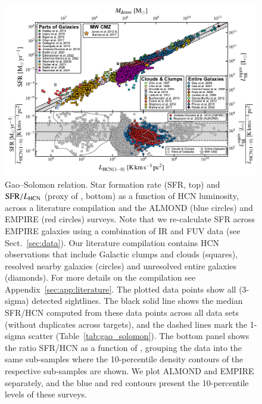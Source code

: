 \documentclass[letter, longauth]{aa} %
\begin{document}
\begin{figure}
\centering
\includegraphics[width=\textwidth]{Figures/GS_relation_literature_compilation_compressed.pdf}
\caption{Gao--Solomon relation. Star formation rate (SFR, top) and $\mathrm{SFR}/L_{\text{HCN}}$ (proxy of \sfedense, bottom) as a function of HCN luminosity, across a literature compilation and the ALMOND (blue circles) and EMPIRE (red circles) surveys.
Note that we re-calculate SFR across EMPIRE galaxies using a combination of IR and FUV data (see Sect.~\ref{sec:data}).
Our literature compilation contains HCN observations that include Galactic clumps and clouds (squares), resolved nearby galaxies (circles) and unresolved entire galaxies (diamonds).
For more details on the compilation see Appendix~\ref{sec:app:literature}.
The plotted data points show all (3-sigma) detected sightlines.
The black solid line shows the median SFR/HCN computed from these data points across all data sets (without duplicates across targets), and the dashed lines mark the 1-sigma scatter (Table~\ref{tab:gao_solomon}).
The bottom panel shows the ratio SFR/HCN as a function of \lhcn, grouping the data into the same sub-samples where the 10-percentile density contours of the respective sub-samples are shown.
We plot ALMOND and EMPIRE separately, and the blue and red contours present the 10-percentile levels of these surveys.
}
\label{fig:gao_solomon_relation}
\end{figure}
\end{document}
